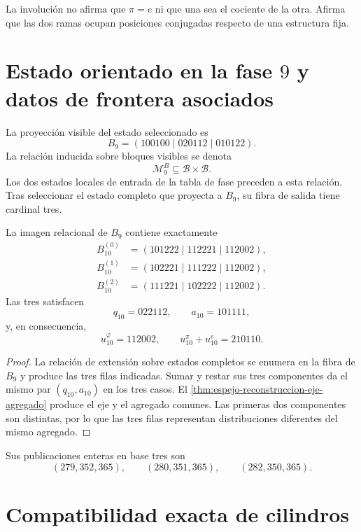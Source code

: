 La involución no afirma que \(\pi=e\) ni que una sea el cociente de la otra.
Afirma que las dos ramas ocupan posiciones conjugadas respecto de una
estructura fija.

\section{Estado orientado en la fase \(9\) y datos de frontera asociados}

La proyección visible del estado seleccionado es
\[
 B_9=(100100\mid020112\mid010122).
\]
La relación inducida sobre bloques visibles se denota
\[
 \mathcal M_9^B\subseteq\mathcal B\times\mathcal B.
\]
Los dos estados locales de entrada de la tabla de fase preceden a esta
relación. Tras seleccionar el estado completo que proyecta a \(B_9\), su
fibra de salida tiene cardinal tres.

\begin{theorem}
\label{thm:espejo-tres-extensiones}
La imagen relacional de \(B_9\) contiene exactamente
\begin{align*}
B_{10}^{(0)}&=(101222\mid112221\mid112002),\\
B_{10}^{(1)}&=(102221\mid111222\mid112002),\\
B_{10}^{(2)}&=(111221\mid102222\mid112002).
\end{align*}
Las tres satisfacen
\[
 q_{10}=022112,
 \qquad
 a_{10}=101111,
\]
y, en consecuencia,
\[
 u_{10}^\varphi=112002,
 \qquad
 u_{10}^\pi+u_{10}^e=210110.
\]
\end{theorem}

\begin{proof}
La relación de extensión sobre estados completos se enumera en la fibra de
\(B_9\) y produce las tres filas indicadas. Sumar y restar sus tres
componentes da el mismo par \((q_{10},a_{10})\) en los tres casos. El
\cref{thm:espejo-reconstruccion-eje-agregado} produce el eje y el agregado
comunes. Las primeras dos componentes son distintas, por lo que las tres
filas representan distribuciones diferentes del mismo agregado.
\end{proof}

Sus publicaciones enteras en base tres son
\[
 (279,352,365),
 \qquad
 (280,351,365),
 \qquad
 (282,350,365).
\]

\section{Compatibilidad exacta de cilindros}

